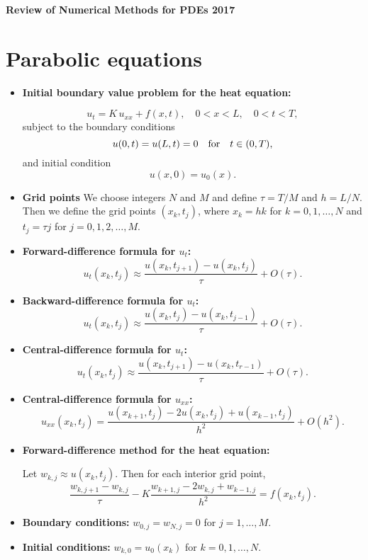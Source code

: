 \documentclass[12pt]{article}
\begin{document}
\centerline{\large \textbf{Review of Numerical Methods for PDEs 2017}}


\section*{Parabolic equations}

\begin{itemize}

\item \textbf{Initial boundary value problem for the heat equation:}

\[
u_{t} = K \, u_{xx}+ f(x,t), \quad
0<x< L, \quad 0 < t < T,   \label{a1}
\]
subject to the boundary conditions
\[
u(0, t) = u(L, t)=0 \quad \hbox{for} \quad t\in (0,T),   \label{a2}
\]
and initial condition
\[
u(x, 0) = u_{0}(x).   \label{a3}
\]

\item \textbf{Grid points}
We choose integers $N$ and $M$ and define
$\tau=T/M$ and $h=L/N$.
Then we define the grid points 
$(x_{k}, t_{j})$, where $x_{k}=hk$ for $k=0,1,\dots,N$ and
$t_{j}=\tau j$ for $j=0,1,2,\dots,M$. 

\item \textbf{Forward-difference formula for $u_{t}$:}
\[
u_{t}(x_k,t_j)\approx \frac{u(x_k,t_{j+1})-u(x_k,t_j)}{\tau} +O(\tau).
\]
\item \textbf{Backward-difference formula  for $u_{t}$:}
\[
u_{t}(x_k,t_j)\approx \frac{u(x_k,t_j)-u(x_k,t_{j-1})}{\tau}+O(\tau).
\]
\item \textbf{Central-difference formula  for $u_{t}$:}
\[
u_{t}(x_k,t_j)\approx \frac{u(x_k,t_{j+1})-u(x_k,t_{r-1})}{\tau}+O(\tau).
\]

\item \textbf{Central-difference formula for $u_{xx}$:}
\[
u_{xx}(x_k,t_j)=\frac{u(x_{k+1},t_j)-2u(x_k,t_j)+u(x_{k-1},t_j)}{h^2}
+O(h^2).
\]




\item \textbf{Forward-difference method for the heat equation:}

Let $w_{k,j}\approx u(x_{k},t_{j})$. Then for each interior grid point,
\[
\frac{w_{k,j+1}-w_{k,j}}{\tau}-K
\frac{w_{k+1, j}-2w_{k,j}+w_{k-1,j}}{h^{2}}=f(x_k,t_j).
\]
\item{\bf Boundary conditions:} $w_{0,j}=w_{N,j}=0$  for $j=1, \dots, M$.
\item{\bf Initial conditions:} $w_{k,0}=u_{0}(x_{k})$  for $k=0, 1, \dots, N$.

\vskip 2mm


\end{itemize}
\end{document}
